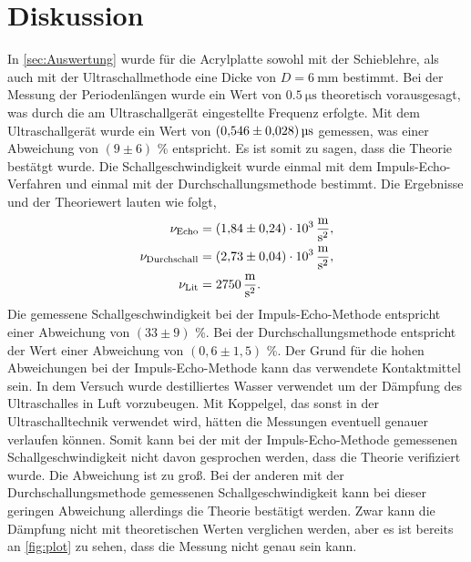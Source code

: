 \section{Diskussion}
\label{sec:Diskussion}

In \autoref{sec:Auswertung} wurde für die Acrylplatte sowohl mit der Schieblehre, als auch mit der Ultraschallmethode eine Dicke von $D = \SI{6}{\milli\meter}$
bestimmt. \newline
Bei der Messung der Periodenlängen wurde ein Wert von $\SI{0,5}{\micro\second}$ theoretisch vorausgesagt, was durch die am Ultraschallgerät eingestellte
Frequenz erfolgte. Mit dem Ultraschallgerät wurde ein Wert von $\SI{0.546 \pm 0.028}{\micro\second}$ gemessen, was einer Abweichung von $(9 \pm 6)$ \%
entspricht. Es ist somit zu sagen, dass die Theorie bestätgt wurde. \newline
Die Schallgeschwindigkeit wurde einmal mit dem Impuls-Echo-Verfahren und einmal mit der Durchschallungsmethode bestimmt. Die Ergebnisse und der Theoriewert \cite{SchallgeschwAcryl} lauten wie folgt,
\begin{align*}
    \nu_{\text{Echo}} &= \SI{1,84 \pm 0,24 e3}{\meter\per\second\squared}, \\
    \nu_{\text{Durchschall}} &= \SI{2.73 \pm 0.04 e3}{\meter\per\second\squared}, \\
    \nu_{\text{Lit}} &= \SI{2750}{\meter\per\second\squared}.
\end{align*}
Die gemessene Schallgeschwindigkeit bei der Impuls-Echo-Methode entspricht einer Abweichung von $(33 \pm 9)$ \%. Bei der Durchschallungsmethode entspricht der
Wert einer Abweichung von $(0,6 \pm 1,5)$ \%. \newline
Der Grund für die hohen Abweichungen bei der Impuls-Echo-Methode kann das verwendete Kontaktmittel sein. In dem Versuch wurde destilliertes Wasser verwendet um der Dämpfung des Ultraschalles
in Luft vorzubeugen. Mit Koppelgel, das sonst in der Ultraschalltechnik verwendet wird, hätten die Messungen eventuell genauer verlaufen können. \newline
Somit kann bei der mit der Impuls-Echo-Methode gemessenen Schallgeschwindigkeit nicht davon gesprochen werden, dass die Theorie verifiziert wurde. Die Abweichung ist zu groß.
Bei der anderen mit der Durchschallungsmethode gemessenen Schallgeschwindigkeit kann bei dieser geringen Abweichung allerdings die Theorie bestätigt werden. \newline
Zwar kann die Dämpfung nicht mit theoretischen Werten verglichen werden, aber es ist bereits an \autoref{fig:plot} zu sehen, dass die Messung nicht genau sein kann.
